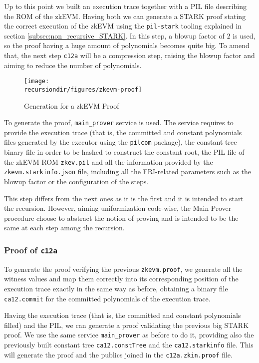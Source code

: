 Up to this point we built an execution trace together with a PIL file describing the ROM of the zkEVM. Having both we can generate a STARK proof stating the correct execution of the zkEVM using the \texttt{pil-stark} tooling explained in section \ref{subsec:non_recursive_STARK}. In this step, a blowup factor of $2$ is used, so the proof having a huge amount of polynomials becomes quite big. To amend that, the next step \texttt{c12a} will be a compression step, raising the blowup factor and aiming to reduce the number of polynomials. 

\begin{figure}[H]
\centering
\texttt{[image: \\recursiondir/figures/zkevm-proof]}
\caption{Generation for a zkEVM Proof}
\label{fig:recursive-zkemv-proof}
\end{figure}

To generate the proof, \texttt{main\_prover} service is used. The service requires to provide the execution trace (that is, the committed and constant polynomials files generated by the executor using the \texttt{pilcom} package), the constant tree binary file in order to be hashed to construct the constant root, the PIL file of the zkEVM ROM \texttt{zkev.pil} and all the information provided by the \texttt{zkevm.starkinfo.json} file, including all the FRI-related parameters such as the blowup factor or the configuration of the steps. 

This step differs from the next ones as it is the first and it is intended to start the recursion. However, aiming uniformization code-wise,  the Main Prover procedure choose to abstract the notion of proving and is intended to be the same at each step among the recursion. 



\subsubsection{Proof of \texttt{c12a}}



To generate the proof verifying the previous \texttt{zkevm.proof}, we generate all the witness values and map them correctly into its corresponding position of the execution trace exactly in the same way as before, obtaining a binary file \texttt{ca12.commit} for the committed polynomials of the execution trace. 

Having the execution trace (that is, the committed and constant polynomials filled) and the PIL, we can generate a proof validating the previous big STARK proof. We use the same service \texttt{main\_prover} as before to do it, providing also the previously built constant tree \texttt{ca12.constTree} and the \texttt{ca12.starkinfo} file. This will generate the proof and the publics joined in the \texttt{c12a.zkin.proof} file.  


